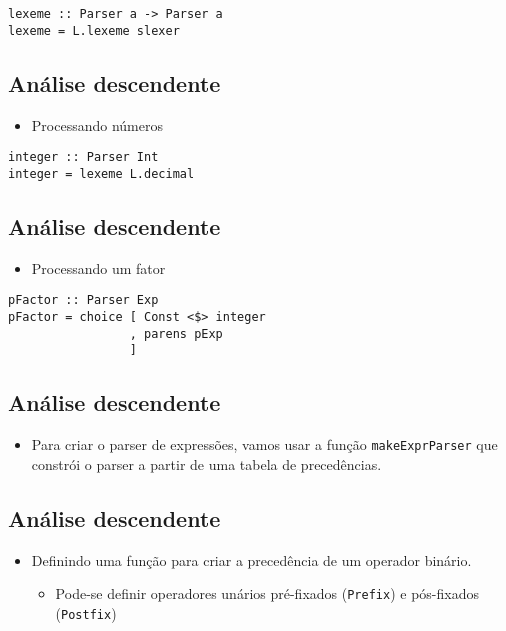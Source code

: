 \documentclass[11pt]{article}
\begin{document}
\begin{verbatim}
lexeme :: Parser a -> Parser a
lexeme = L.lexeme slexer
\end{verbatim}
\subsection*{Análise descendente}
\label{sec:org792f05d}

\begin{itemize}
\item Processando números
\end{itemize}

\begin{verbatim}
integer :: Parser Int
integer = lexeme L.decimal
\end{verbatim}
\subsection*{Análise descendente}
\label{sec:orga99f5ce}

\begin{itemize}
\item Processando um fator
\end{itemize}

\begin{verbatim}
pFactor :: Parser Exp
pFactor = choice [ Const <$> integer
                 , parens pExp
                 ]

\end{verbatim}
\subsection*{Análise descendente}
\label{sec:org145acc4}

\begin{itemize}
\item Para criar o parser de expressões, vamos usar a função \texttt{makeExprParser} que constrói o parser a partir de uma tabela de precedências.
\end{itemize}
\subsection*{Análise descendente}
\label{sec:org6d5264b}

\begin{itemize}
\item Definindo uma função para criar a precedência de um operador binário.
\begin{itemize}
\item Pode-se definir operadores unários pré-fixados (\texttt{Prefix}) e pós-fixados (\texttt{Postfix})
\end{itemize}
\end{itemize}
\end{document}
